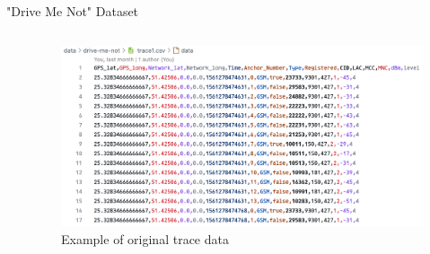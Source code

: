\documentclass[aspectratio=169, 8pt]{beamer}
\begin{document}
\begin{frame}{"Drive Me Not" Dataset}
\begin{columns}[T]
\begin{column}{0.5\linewidth}
\begin{itemize}
            \end{itemize}
                
        \end{column}
        \begin{column}{0.6\linewidth}
            \begin{figure}
                \centering
                \includegraphics[width = \linewidth]{images/drive-me-not-data.png}
                \caption{Example of original trace data}
                \label{fig:enter-label}
            \end{figure}
        \end{column}
    \end{columns}
\end{frame}
        
        
            

            

\end{document}
